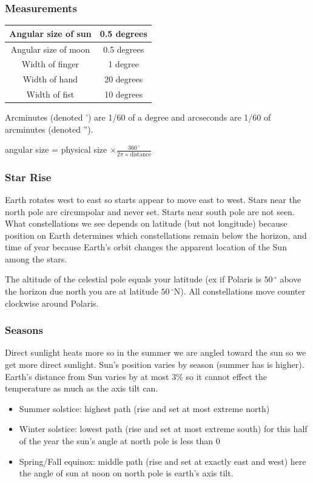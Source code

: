 \documentclass[12pt]{article}
\begin{document}
\subsubsection{Measurements}
\begin{center}
\begin{tabular}{|c|c|}
    \hline
    Angular size of sun & 0.5 degrees\\
    \hline
    Angular size of moon & 0.5 degrees\\
    \hline
    Width of finger &1 degree\\
    \hline
    Width of hand & 20 degrees \\
    \hline
    Width of fist & 10 degrees\\
    \hline
\end{tabular}
\end{center}
Arcminutes (denoted ') are 1/60 of a degree and arcseconds are 1/60 of arcminutes (denoted '').
\begin{center}
    angular size = physical size $\times \frac{360\,^{\circ}}{2\pi \times \text{distance}}$
\end{center}

\subsubsection{Star Rise}
Earth rotates west to east so starts appear to move east to west. Stars near the north pole are circumpolar and never set. Starts near south pole are not seen.
What constellations we see depends on latitude (but not longitude) because position on Earth determines which constellations remain below the horizon, and time of year because Earth's orbit changes the apparent location of the Sun among the stars.

The altitude of the celestial pole equals your latitude (ex if Polaris is $50\,^{\circ}$ above the horizon due north you are at latitude $50\,^{\circ}$N). All constellations move counter clockwise around Polaris.

\subsubsection{Seasons}
Direct sunlight heats more so in the summer we are angled toward the sun so we get more direct sunlight. Sun's position varies by season (summer has is higher). Earth's distance from Sun varies by at most 3\% so it cannot effect the temperature as much as the axis tilt can.
\begin{itemize}
    \item Summer solstice: highest path (rise and set at most extreme north)
    \item Winter solstice: lowest path (rise and set at most extreme south) for this half of the year the sun's angle at north pole is less than 0
    \item Spring/Fall equinox: middle path (rise and set at exactly east and west) here the angle of sun at noon on north pole is earth's axis tilt.
\end{itemize}
\end{document}
